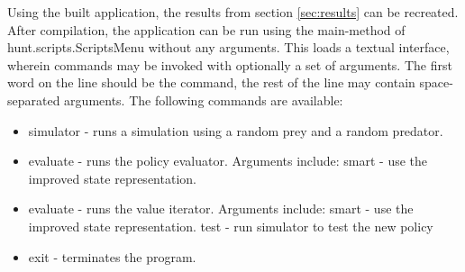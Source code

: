Using the built application, the results from section \ref{sec:results} can be recreated. After compilation, the application can be run using the main-method of hunt.scripts.ScriptsMenu without any arguments. This loads a textual interface, wherein commands may be invoked with optionally a set of arguments. The first word on the line should be the command, the rest of the line may contain space-separated arguments. The following commands are available:

\begin{itemize}
  \item simulator - runs a simulation using a random prey and a random predator.
  \item evaluate - runs the policy evaluator. Arguments include:
    \subitem smart - use the improved state representation.
  \item evaluate - runs the value iterator. Arguments include:
    \subitem smart - use the improved state representation.
     \subitem test - run simulator to test the new policy
  \item exit - terminates the program.
\end{itemize}